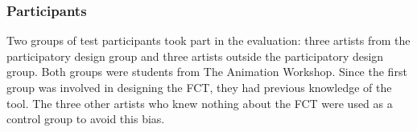 \subsubsection{Participants}
Two groups of test participants took part in the evaluation: three artists from the participatory design group and three artists outside the participatory design group. Both groups were students from The Animation Workshop. Since the first group was involved in designing the FCT, they had previous knowledge of the tool. The three other artists who knew nothing about the FCT were used as a control group to avoid this bias.